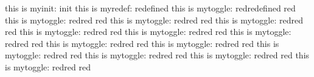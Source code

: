 \documentclass{article}
\newcommand{\myinit}{this is myinit: \def\myvar{init} \myvar \newline}
\newcommand{\myredef}{this is myredef: \def\myvar{redefined} \myvar \newline}
\newcommand{\mytoggle}{this is mytoggle: 
    \def\myred{red}
	\ifx \myred\myvar
		\def\myvar{green}
	\else
	    \def\myvar{red}
    \fi
  	\myvar \newline}
\begin{document}
\myinit
\myredef
\mytoggle
\mytoggle
\mytoggle
\mytoggle
\mytoggle
\mytoggle
\mytoggle
\mytoggle
\mytoggle
\mytoggle
\mytoggle
\mytoggle
\mytoggle
\end{document}
